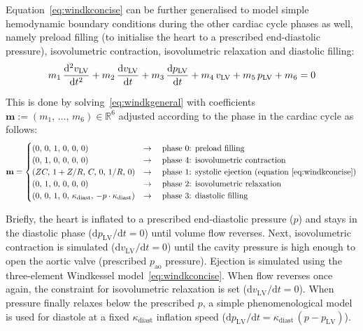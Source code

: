 \vspace{0.2cm}
Equation~\eqref{eq:windkconcise} can be further generalised to model simple hemodynamic boundary conditions during the other cardiac cycle phases as well, namely preload filling (to initialise the heart to a prescribed end-diastolic pressure), isovolumetric contraction, isovolumetric relaxation and diastolic filling:
%
\begin{equation}\label{eq:windkgeneral}
    m_1\,\dfrac{\mathrm{d}^2{v_{\textrm{LV}}}}{\mathrm{d}{t}^2} + m_2\,\dfrac{\mathrm{d}{v_{\textrm{LV}}}}{\mathrm{d}{t}} + m_3\,\dfrac{\mathrm{d}{p_{\textrm{LV}}}}{\mathrm{d}{t}} + m_4\,v_{\textrm{LV}} + m_5\,p_{\textrm{LV}} +  m_6 = 0
\end{equation}

\noindent
This is done by solving~\eqref{eq:windkgeneral} with coefficients  $\mathbf{m}:=(m_1,\,\dots,\,m_6)\in\mathbb{R}^6$ adjusted according to the phase in the cardiac cycle as follows:
%
\begin{equation}
    \mathbf{m} = \begin{cases}
    (0,\,0,\,1,\,0,\,0,\,0) & \rightarrow\quad\text{phase $0$: preload filling} \\
    (0,\,1,\,0,\,0,\,0,\,0) & \rightarrow\quad\text{phase $4$: isovolumetric contraction} \\
    (ZC,\,1+Z/R,\,C,\,0,\,1/R,\,0) & \rightarrow\quad\text{phase $1$: systolic ejection (equation~\eqref{eq:windkconcise})} \\
    (0,\,1,\,0,\,0,\,0,\,0) & \rightarrow\quad\text{phase $2$: isovolumetric relaxation} \\
    (0,\,0,\,1,\,0,\,\kappa_{\textrm{diast}},\,-p\cdot \kappa_{\textrm{diast}}) & \rightarrow\quad\text{phase $3$: diastolic filling}
    \end{cases}
\end{equation}

\noindent
Briefly, the heart is inflated to a prescribed end-diastolic pressure ($p$) and stays in the diastolic phase ($\textrm{d}p_{\textrm{LV}}/\textrm{d}t=0$) until volume flow reverses. Next, isovolumetric contraction is simulated ($\textrm{d}v_{\textrm{LV}}/\textrm{d}t=0$) until the cavity pressure is high enough to open the aortic valve (prescribed $p_{\textrm{ao}}$ pressure). Ejection is simulated using the three-element Windkessel model~\eqref{eq:windkconcise}. When flow reverses once again, the constraint for isovolumetric relaxation is set ($\textrm{d}v_{\textrm{LV}}/\textrm{d}t=0$). When pressure finally relaxes below the prescribed $p$, a simple phenomenological model is used for diastole at a fixed $\kappa_{\textrm{diast}}$ inflation speed ($\textrm{d}p_{\textrm{LV}}/\textrm{d}t=\kappa_{\textrm{diast}}\,(p - p_{\textrm{LV}})$).


